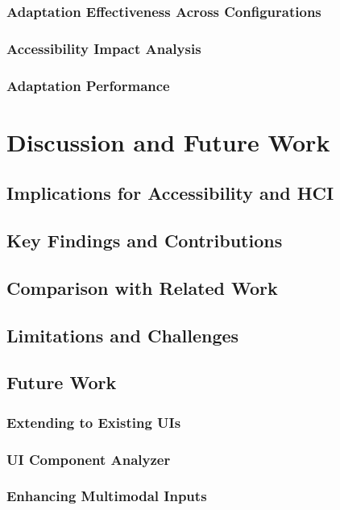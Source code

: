 \documentclass[openany]{book}
\begin{document}
    \subsection{Adaptation Effectiveness Across Configurations}
    \subsection{Accessibility Impact Analysis}
    \subsection{Adaptation Performance}


\chapter{Discussion and Future Work}
\section{Implications for Accessibility and HCI}
\section{Key Findings and Contributions}
\section{Comparison with Related Work}
\section{Limitations and Challenges}
\section{Future Work} 
    \subsection{Extending to Existing UIs}
    \subsection{UI Component Analyzer}
    \subsection{Enhancing Multimodal Inputs}
\end{document}
